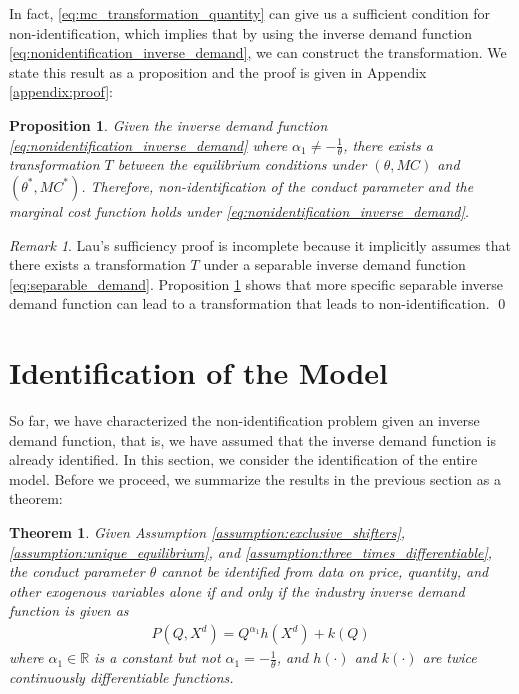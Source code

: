 \documentclass[11pt, a4paper]{article}
\newtheorem{theorem}{Theorem}
\newtheorem{proposition}{Proposition}
\theoremstyle{remark}
\newtheorem{remark}{Remark}
\begin{document}
In fact, \eqref{eq:mc_transformation_quantity} can give us a sufficient condition for non-identification, which implies that by using the inverse demand function \eqref{eq:nonidentification_inverse_demand}, we can construct the transformation.
We state this result as a proposition and the proof is given in Appendix \ref{appendix:proof}:
\begin{proposition}\label{proposition:sufficient_nonidentification}
    Given the inverse demand function \eqref{eq:nonidentification_inverse_demand} where $\alpha_1 \ne -\frac{1}{\theta}$, there exists a transformation $T$ between the equilibrium conditions under $(\theta, MC)$ and $(\theta^{*}, MC^{*})$.
    Therefore, non-identification of the conduct parameter and the marginal cost function holds under \eqref{eq:nonidentification_inverse_demand}.
\end{proposition}


\begin{remark}
    Lau's sufficiency proof is incomplete because it implicitly assumes that there exists a transformation $T$ under a separable inverse demand function \eqref{eq:separable_demand}.
    Proposition \ref{proposition:sufficient_nonidentification} shows that more specific separable inverse demand function can lead to a transformation that leads to non-identification. \qed
\end{remark}

\section{Identification of the Model}

So far, we have characterized the non-identification problem given an inverse demand function, that is, we have assumed that the inverse demand function is already identified.
In this section, we consider the identification of the entire model.
Before we proceed, we summarize the results in the previous section as a theorem:
\begin{theorem}\label{theorem:identification_characterization}
    Given Assumption \ref{assumption:exclusive_shifters}, \ref{assumption:unique_equilibrium}, and \ref{assumption:three_times_differentiable}, the conduct parameter $\theta$ cannot be identified from data on price, quantity, and other exogenous variables alone if and only if the industry inverse demand function is given as
    \begin{align}
        P(Q, X^{d}) = Q^{\alpha_1}h(X^{d}) + k(Q)
    \end{align}
    where $\alpha_1 \in \mathbb{R}$ is a constant but not $\alpha_1 = -\frac{1}{\theta}$, and $h(\cdot)$ and $k(\cdot)$ are twice continuously differentiable functions.
\end{theorem}
\end{document}
